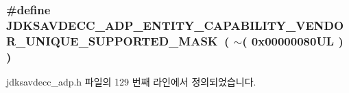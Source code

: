 \subsubsection[{\texorpdfstring{J\+D\+K\+S\+A\+V\+D\+E\+C\+C\+\_\+\+A\+D\+P\+\_\+\+E\+N\+T\+I\+T\+Y\+\_\+\+C\+A\+P\+A\+B\+I\+L\+I\+T\+Y\+\_\+\+V\+E\+N\+D\+O\+R\+\_\+\+U\+N\+I\+Q\+U\+E\+\_\+\+S\+U\+P\+P\+O\+R\+T\+E\+D\+\_\+\+M\+A\+SK}{JDKSAVDECC_ADP_ENTITY_CAPABILITY_VENDOR_UNIQUE_SUPPORTED_MASK}}]{\setlength{\rightskip}{0pt plus 5cm}\#define J\+D\+K\+S\+A\+V\+D\+E\+C\+C\+\_\+\+A\+D\+P\+\_\+\+E\+N\+T\+I\+T\+Y\+\_\+\+C\+A\+P\+A\+B\+I\+L\+I\+T\+Y\+\_\+\+V\+E\+N\+D\+O\+R\+\_\+\+U\+N\+I\+Q\+U\+E\+\_\+\+S\+U\+P\+P\+O\+R\+T\+E\+D\+\_\+\+M\+A\+SK~( $\sim$( 0x00000080\+U\+L ) )}\hypertarget{group__adp__entity__capability_ga2e2bb8dd7d14ef521016bea5287584a6}{}\label{group__adp__entity__capability_ga2e2bb8dd7d14ef521016bea5287584a6}


jdksavdecc\+\_\+adp.\+h 파일의 129 번째 라인에서 정의되었습니다.


